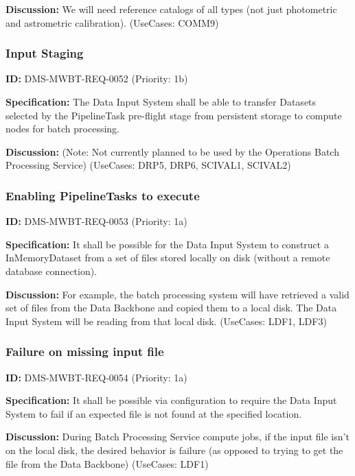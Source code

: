\documentclass[SE,toc,lsstdraft]{lsstdoc}
\begin{document}
\textbf{Discussion:}
We will need reference catalogs of all types (not just photometric and astrometric calibration). (UseCases: COMM9)

\subsubsection{Input Staging}

\label{DMS-MWBT-REQ-0052}
\textbf{ID:} DMS-MWBT-REQ-0052 (Priority: 1b)

\textbf{Specification:}
The Data Input System shall be able to transfer Datasets selected by the PipelineTask pre-flight stage from persistent storage to compute nodes for batch processing.

\textbf{Discussion:}
(Note: Not currently planned to be used by the Operations Batch Processing Service) (UseCases: DRP5, DRP6, SCIVAL1, SCIVAL2)

\subsubsection{Enabling PipelineTasks to execute}

\label{DMS-MWBT-REQ-0053}
\textbf{ID:} DMS-MWBT-REQ-0053 (Priority: 1a)

\textbf{Specification:}
It shall be possible for the Data Input System to construct a InMemoryDataset from a set of files stored locally on disk (without a remote database connection).

\textbf{Discussion:}
For example, the batch processing system will have retrieved a valid set of files from the Data Backbone and copied them to a local disk. The Data Input System will be reading from that local disk. (UseCases: LDF1, LDF3)

\subsubsection{Failure on missing input file}

\label{DMS-MWBT-REQ-0054}
\textbf{ID:} DMS-MWBT-REQ-0054 (Priority: 1a)

\textbf{Specification:}
It shall be possible via configuration to require the Data Input System to fail if an expected file is not found at the specified location.

\textbf{Discussion:}
During Batch Processing Service compute jobs, if the input file isn't on the local disk, the desired behavior is failure (as opposed to trying to get the file from the Data Backbone) (UseCases: LDF1)
\end{document}

